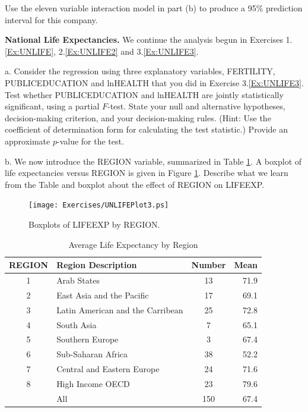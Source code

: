 \begin{exercises}
Use the eleven variable interaction model in part (b) to produce a
95\% prediction interval for this company.


\item \textbf{National Life Expectancies.}\label{Ex:UNLIFE4} We
continue the analysis begun in Exercises 1.\ref{Ex:UNLIFE},
2.\ref{Ex:UNLIFE2} and 3.\ref{Ex:UNLIFE3}.

a. Consider the regression using three explanatory variables,
FERTILITY, PUBLICEDUCATION and lnHEALTH that you did in Exercise
3.\ref{Ex:UNLIFE3}. Test whether PUBLICEDUCATION and lnHEALTH are
jointly statistically significant, using a partial $F$-test. State
your null and alternative hypotheses, decision-making criterion, and
your decision-making rules. (Hint: Use the coefficient of
determination form for calculating the test statistic.) Provide an
approximate $p$-value for the test.

b. We now introduce the REGION variable, summarized in Table
\ref{Ex:UNLIFERegionStats}. A boxplot of life expectancies versus
REGION is given in Figure \ref{Ex:UNLIFEPlot3}. Describe what we
learn from the Table and boxplot about the effect of REGION on
LIFEEXP.


\begin{figure}[htp]
  \begin{center}
   \texttt{[image: Exercises/UNLIFEPlot3.ps]}
   \caption{\label{Ex:UNLIFEPlot3} \small  Boxplots of LIFEEXP by REGION.}
  \end{center}
\end{figure}


\begin{table}[h]

 \caption{\label{Ex:UNLIFERegionStats} \small Average
Life Expectancy by Region}
\begin{center}
\begin{tabular}{c|lcr}
\hline
    REGION & Region Description &     Number &       Mean \\ \hline
         1 & Arab States &         13 &       71.9 \\
         2 & East Asia and the Pacific &         17 &       69.1 \\
         3 & Latin American and the Carribean &         25 &       72.8 \\
         4 & South Asia &          7 &       65.1 \\
         5 & Southern Europe &          3 &       67.4 \\
         6 & Sub-Saharan Africa &         38 &       52.2 \\
         7 & Central and Eastern Europe &         24 &       71.6 \\
         8 & High Income OECD &         23 &       79.6 \\\hline
           & All          &        150 &     67.4       \\\hline
\end{tabular}
\end{center}
\end{table}


\end{exercises}
